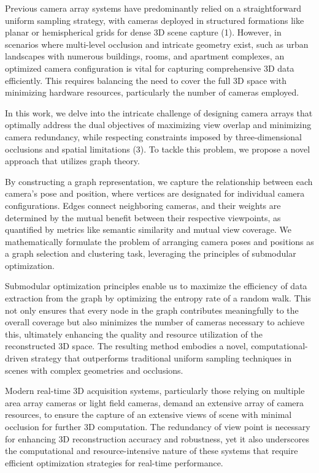 Previous camera array systems have predominantly relied on a straightforward uniform sampling strategy, with cameras deployed in structured formations like planar or hemispherical grids for dense 3D scene capture (1). However, in scenarios where multi-level occlusion and intricate geometry exist, such as urban landscapes with numerous buildings, rooms, and apartment complexes, an optimized camera configuration is vital for capturing comprehensive 3D data efficiently. This requires balancing the need to cover the full 3D space with minimizing hardware resources, particularly the number of cameras employed.

In this work, we delve into the intricate challenge of designing camera arrays that optimally address the dual objectives of maximizing view overlap and minimizing camera redundancy, while respecting constraints imposed by three-dimensional occlusions and spatial limitations (3). To tackle this problem, we propose a novel approach that utilizes graph theory.

By constructing a graph representation, we capture the relationship between each camera’s pose and position, where vertices are designated for individual camera configurations. Edges connect neighboring cameras, and their weights are determined by the mutual benefit between their respective viewpoints, as quantified by metrics like semantic similarity and mutual view coverage. We mathematically formulate the problem of arranging camera poses and positions as a graph selection and clustering task, leveraging the principles of submodular optimization.

Submodular optimization principles enable us to maximize the efficiency of data extraction from the graph by optimizing the entropy rate of a random walk. This not only ensures that every node in the graph contributes meaningfully to the overall coverage but also minimizes the number of cameras necessary to achieve this, ultimately enhancing the quality and resource utilization of the reconstructed 3D space. The resulting method embodies a novel, computational-driven strategy that outperforms traditional uniform sampling techniques in scenes with complex geometries and occlusions.




Modern real-time 3D acquisition systems, particularly those relying on multiple area array cameras or light field cameras, demand an extensive array of camera resources, to ensure the capture of an extensive views of scene with minimal occlusion for further 3D computation.
The redundancy of view point is necessary for enhancing 3D reconstruction accuracy and robustness, yet it also underscores the computational and resource-intensive nature of these systems that require efficient optimization strategies for real-time performance.


